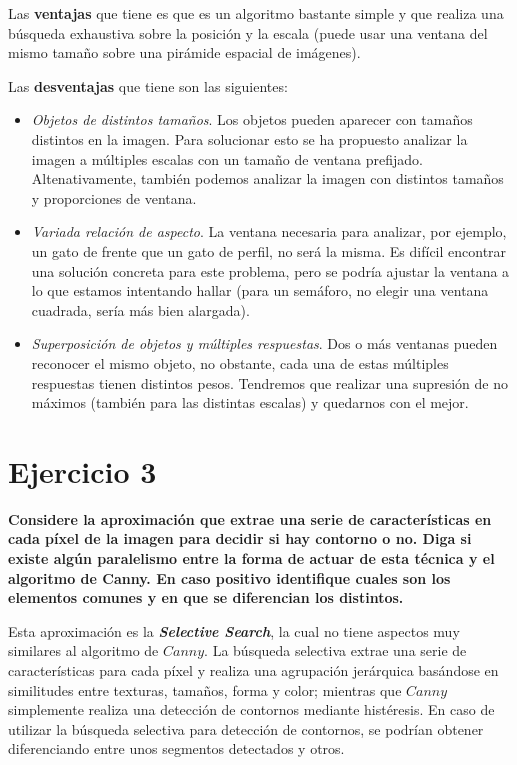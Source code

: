 \documentclass[11pt,a4paper]{article}
\begin{document}
Las \textbf{ventajas} que tiene es que es un algoritmo bastante simple y que realiza una búsqueda exhaustiva sobre la posición y la escala (puede usar
una ventana del mismo tamaño sobre una pirámide espacial de imágenes).

Las \textbf{desventajas} que tiene son las siguientes:
\begin{itemize}
	\item \textit{Objetos de distintos tamaños}. Los objetos pueden aparecer con tamaños distintos en la imagen. Para solucionar esto se ha propuesto analizar
          la imagen a múltiples escalas con un tamaño de ventana prefijado. Altenativamente, también podemos analizar la imagen con distintos tamaños y proporciones
          de ventana.
	\item \textit{Variada relación de aspecto}. La ventana necesaria para analizar, por ejemplo, un gato de frente que un gato de perfil, no será la misma.
		  Es difícil encontrar una solución concreta para este problema, pero se podría ajustar la ventana a lo que estamos intentando hallar (para un semáforo,
          no elegir una ventana cuadrada, sería más bien alargada).
	\item \textit{Superposición de objetos y múltiples respuestas}. Dos o más ventanas pueden reconocer el mismo objeto, no obstante, cada una de estas múltiples
		  respuestas tienen distintos pesos. Tendremos que realizar una supresión de no máximos (también para las distintas escalas) y quedarnos con el mejor.
\end{itemize}


\section*{Ejercicio 3}

\textbf{Considere la aproximación que extrae una serie de características en cada píxel de la imagen para decidir si hay contorno o no. Diga si existe algún
paralelismo entre la forma de actuar de esta técnica y el algoritmo de Canny. En caso positivo identifique cuales son los elementos comunes y en que se
diferencian los distintos.}

Esta aproximación es la \textbf{\textit{Selective Search}}, la cual no tiene aspectos muy similares al algoritmo de $Canny$. La búsqueda selectiva extrae una
serie de características para cada píxel y realiza una agrupación jerárquica basándose en similitudes entre texturas, tamaños, forma y color; mientras que
$Canny$ simplemente realiza una detección de contornos mediante histéresis. En caso de utilizar la búsqueda selectiva para detección de contornos, se podrían
obtener diferenciando entre unos segmentos detectados y otros.
\end{document}
